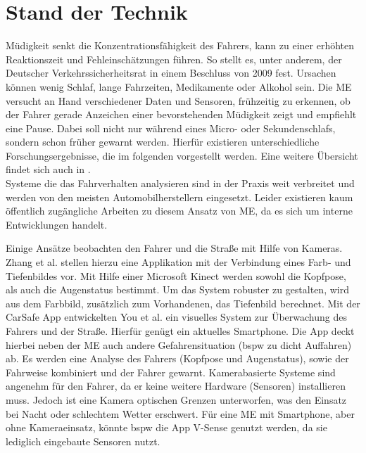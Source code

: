 {\section{Stand der Technik}
\label{chap:me}
Müdigkeit senkt die Konzentrationsfähigkeit des Fahrers, kann zu einer erhöhten Reaktionszeit und Fehleinschätzungen führen. So stellt es, unter anderem, der Deutscher Verkehrssicherheitsrat in einem Beschluss von 2009 \cite{DVR:Online} fest. Ursachen können wenig Schlaf, lange Fahrzeiten, Medikamente oder Alkohol sein.
Die \acl{ME} versucht an Hand verschiedener Daten und Sensoren, frühzeitig zu erkennen, ob der Fahrer gerade Anzeichen einer bevorstehenden Müdigkeit zeigt und empfiehlt eine Pause. Dabei soll nicht nur während eines Micro- oder Sekundenschlafs, sondern schon früher gewarnt werden. Hierfür existieren unterschiedliche Forschungsergebnisse, die im folgenden vorgestellt werden. Eine weitere Übersicht findet sich auch in \cite{Sahayadhas_121216937}.\\

Systeme die das Fahrverhalten analysieren sind in der Praxis weit verbreitet und werden von den meisten Automobilherstellern eingesetzt. Leider existieren kaum öffentlich zugängliche Arbeiten zu diesem Ansatz von  \acl{ME}, da es sich um interne Entwicklungen handelt.

Einige Ansätze beobachten den Fahrer und die Straße mit Hilfe von Kameras. Zhang et al. \cite{Zhang:2015:RSD:2753829.2629482} stellen hierzu eine Applikation mit der Verbindung eines Farb- und Tiefenbildes vor. Mit Hilfe einer Microsoft Kinect werden sowohl die Kopfpose, als auch die Augenstatus bestimmt. Um das System robuster zu gestalten, wird aus dem Farbbild,  zusätzlich zum Vorhandenen, das Tiefenbild berechnet. Mit der CarSafe App entwickelten You et al. \cite{You:2013:CAA:2462456.2465428} ein visuelles System zur Überwachung des Fahrers und der Straße. Hierfür genügt ein aktuelles Smartphone. Die App deckt hierbei neben der \acl{ME} auch andere Gefahrensituation (\acl{bspw} zu dicht Auffahren) ab. Es werden eine Analyse des Fahrers (Kopfpose und Augenstatus), sowie der Fahrweise kombiniert und der Fahrer gewarnt. Kamerabasierte Systeme sind angenehm für den Fahrer, da er keine weitere Hardware (Sensoren) installieren muss. Jedoch ist eine Kamera optischen Grenzen unterworfen, was den Einsatz bei Nacht oder schlechtem Wetter erschwert. Für eine \acl{ME} mit Smartphone, aber ohne Kameraeinsatz, könnte \acl{bspw} die App V-Sense \cite{Chen:2015:ISV:2742647.2742659} genutzt werden, da sie lediglich  eingebaute Sensoren nutzt.\\

}
